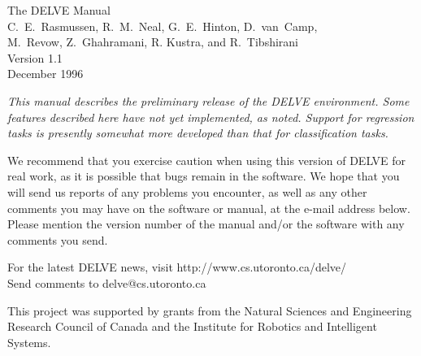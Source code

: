 \documentclass[12pt]{article}
\newcommand{\wwwhome}{http://www.cs.utoronto.ca/\maketilde{}delve/}
\newcommand{\maketilde}{\raisebox{0.4ex}{\scriptsize $\sim$}}
\begin{document}

\begin{center}
   \vspace*{1in}
   {\huge The DELVE Manual} \\[26pt]

   {\large C.~E.~Rasmussen, R.~M.~Neal, G.~E.~Hinton, D.~van~Camp,} \\[5pt]
   {\large M.~Revow, Z.~Ghahramani, R. Kustra, and R.~Tibshirani}   \\[20pt]

   {\large Version 1.1} \\
   December 1996
\end{center}

\vfill

\begin{list}{}{
\setlength{\leftmargin}{0.25in}\setlength{\rightmargin}{0.25in}}\item[]\em
    This manual describes the preliminary release of the DELVE environment.
    Some features described here have not yet implemented, as noted.
    Support for regression tasks is presently somewhat more developed than 
    that for classification tasks.\vspace{3pt}

    We recommend that you exercise caution when using this version of 
    DELVE for real work, as it is possible that bugs remain in the software.
    We hope that you will send us reports of any problems you encounter,
    as well as any other comments you may have on the software or manual, 
    at the e-mail address below.  Please mention the version number of
    the manual and/or the software with any comments you send.
\end{list}

\vfill\vfill

\begin{centering}

For the latest DELVE news, visit \wwwhome\\[4pt]
Send comments to delve@cs.utoronto.ca

\end{centering}\vspace{8pt}

\noindent This project was supported by grants from the Natural Sciences and
Engineering Research Council of Canada and the Institute for
Robotics and Intelligent Systems.
\end{document}
